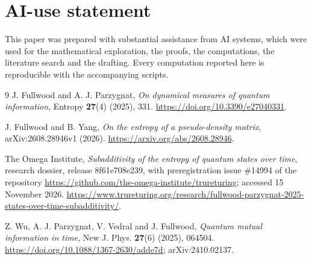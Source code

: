 \documentclass[11pt,a4paper]{article}
\theoremstyle{definition}\newtheorem{definition}[theorem]{Definition}
\theoremstyle{remark}\newtheorem{remark}[theorem]{Remark}
\begin{document}
\section*{AI-use statement}
This paper was prepared with substantial assistance from AI systems, which were used for the mathematical exploration, the proofs, the computations, the literature search and the drafting. Every computation reported here is reproducible with the accompanying scripts.

\begin{thebibliography}{9}
J. Fullwood and A. J. Parzygnat,
\emph{On dynamical measures of quantum information},
Entropy \textbf{27}(4) (2025), 331.
\url{https://doi.org/10.3390/e27040331}.

J. Fullwood and B. Yang,
\emph{On the entropy of a pseudo-density matrix},
arXiv:2608.28946v1 (2026).
\url{https://arxiv.org/abs/2608.28946}.

The Omega Institute,
\emph{Subadditivity of the entropy of quantum states over time},
research dossier, release 8f61e708e239, with preregistration issue \#14994 of the repository
\url{https://github.com/the-omega-institute/trureturing}; accessed 15 November 2026.
\url{https://www.trureturing.org/research/fullwood-parzygnat-2025-states-over-time-subadditivity/}.

Z. Wu, A. J. Parzygnat, V. Vedral and J. Fullwood,
\emph{Quantum mutual information in time},
New J. Phys. \textbf{27}(6) (2025), 064504.
\url{https://doi.org/10.1088/1367-2630/adde7d}; arXiv:2410.02137.
\end{thebibliography}
\end{document}
